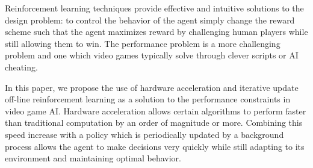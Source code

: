 Reinforcement learning techniques provide effective and intuitive solutions to the design problem: to control the behavior of the agent simply change the reward scheme such that the agent maximizes reward by challenging human players while still allowing them to win. The performance problem is a more challenging problem and one which video games typically solve through clever scripts or AI cheating. \cite{game:ai:history}

In this paper, we propose the use of hardware acceleration and iterative update off-line reinforcement learning as a solution to the performance constraints in video game AI. Hardware acceleration allows certain algorithms to perform faster than traditional computation by an order of magnitude or more. Combining this speed increase with a policy which is periodically updated by a background process allows the agent to make decisions very quickly while still adapting to its environment and maintaining optimal behavior.